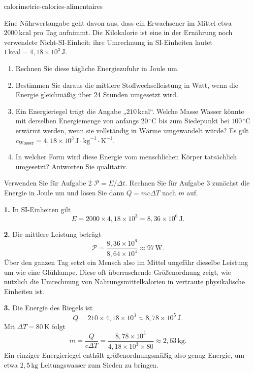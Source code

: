 \begin{exo}{calorimetrie-calories-alimentaires}

Eine Nährwertangabe geht davon aus, dass ein Erwachsener im Mittel etwa $2000\,\text{kcal}$ pro Tag aufnimmt. Die Kilokalorie ist eine in der Ernährung noch verwendete Nicht-SI-Einheit; ihre Umrechnung in SI-Einheiten lautet $1\,\text{kcal}=4{,}18\times10^3\,\text{J}$.

\begin{enumerate}
  \item Rechnen Sie diese tägliche Energiezufuhr in Joule um.
  \item Bestimmen Sie daraus die mittlere Stoffwechselleistung in Watt, wenn die Energie gleichmäßig über 24 Stunden umgesetzt wird.
  \item Ein Energieriegel trägt die Angabe „$210\,\text{kcal}$“. Welche Masse Wasser könnte mit derselben Energiemenge von anfangs $20\,^\circ\text{C}$ bis zum Siedepunkt bei $100\,^\circ\text{C}$ erwärmt werden, wenn sie vollständig in Wärme umgewandelt würde? Es gilt $c_{\text{Wasser}}=4{,}18\times10^3\,\text{J}\!\cdot\!\text{kg}^{-1}\!\cdot\!\text{K}^{-1}$.
  \item In welcher Form wird diese Energie vom menschlichen Körper tatsächlich umgesetzt? Antworten Sie qualitativ.
\end{enumerate}

\begin{indication}
Verwenden Sie für Aufgabe 2 $\mathcal P=E/\Delta t$. Rechnen Sie für Aufgabe 3 zunächst die Energie in Joule um und lösen Sie dann $Q=mc\Delta T$ nach $m$ auf.
\end{indication}

\begin{solution}
\textbf{1.} In SI-Einheiten gilt
\[
E=2000\times4{,}18\times10^3
=8{,}36\times10^6\,\text{J}.
\]

\textbf{2.} Die mittlere Leistung beträgt
\[
\mathcal P=\frac{8{,}36\times10^6}{8{,}64\times10^4}\approx97\,\text{W}.
\]
Über den ganzen Tag setzt ein Mensch also im Mittel ungefähr dieselbe Leistung um wie eine Glühlampe. Diese oft überraschende Größenordnung zeigt, wie nützlich die Umrechnung von Nahrungsmittelkalorien in vertraute physikalische Einheiten ist.

\textbf{3.} Die Energie des Riegels ist
\[
Q=210\times4{,}18\times10^3\approx8{,}78\times10^5\,\text{J}.
\]
Mit $\Delta T=80\,\text{K}$ folgt
\[
m=\frac{Q}{c\Delta T}
=\frac{8{,}78\times10^5}{4{,}18\times10^3\times80}
\approx2{,}63\,\text{kg}.
\]
Ein einziger Energieriegel enthält größenordnungsmäßig also genug Energie, um etwa $2{,}5\,\text{kg}$ Leitungswasser zum Sieden zu bringen.


\end{solution}
\end{exo}
